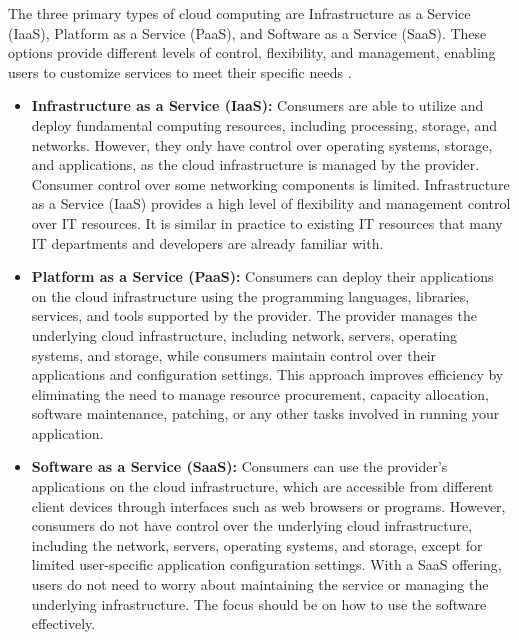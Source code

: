 The three primary types of cloud computing are Infrastructure as a Service (IaaS), Platform as a Service (PaaS), and Software as a Service (SaaS). These options provide different levels of control, flexibility, and management, enabling users to customize services to meet their specific needs \cite{AWSWhatIsCloudComputing}.
\begin{itemize}
    \item \textbf{Infrastructure as a Service (IaaS): } Consumers are able to utilize and deploy fundamental computing resources, including processing, storage, and networks. However, they only have control over operating systems, storage, and applications, as the cloud infrastructure is managed by the provider. Consumer control over some networking components is limited. Infrastructure as a Service (IaaS) provides a high level of flexibility and management control over IT resources. It is similar in practice to existing IT resources that many IT departments and developers are already familiar with. 
    \item \textbf{Platform as a Service (PaaS): } Consumers can deploy their applications on the cloud infrastructure using the programming languages, libraries, services, and tools supported by the provider. The provider manages the underlying cloud infrastructure, including network, servers, operating systems, and storage, while consumers maintain control over their applications and configuration settings. This approach improves efficiency by eliminating the need to manage resource procurement, capacity allocation, software maintenance, patching, or any other tasks involved in running your application. 
    \item \textbf{Software as a Service (SaaS): } Consumers can use the provider's applications on the cloud infrastructure, which are accessible from different client devices through interfaces such as web browsers or programs. However, consumers do not have control over the underlying cloud infrastructure, including the network, servers, operating systems, and storage, except for limited user-specific application configuration settings. With a SaaS offering, users do not need to worry about maintaining the service or managing the underlying infrastructure. The focus should be on how to use the software effectively.
\end{itemize}


